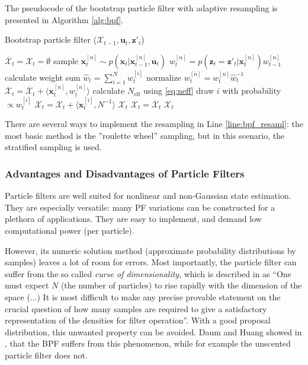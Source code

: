 The pseudocode of the bootstrap particle filter with adaptive resampling is presented in Algorithm \ref{alg:bpf}.
\begin{algorithm}[b!]
  \caption{Bootstrap particle filter ($\mathcal{X}_{t-1}, \mathbf{u}_t, \mathbf{z}'_t$)}\label{alg:bpf}
  \begin{algorithmic}[1]
    \State $\overline{\mathcal{X}}_t = \mathcal{X}_t = \emptyset$
    \State sample $\mathbf{x}_t^{[n]} \sim p(\mathbf{x}_t|\mathbf{x}_{t-1}^{[n]},\mathbf{u}_t)$
    \State$w_t^{[n]} = p(\mathbf{z}_t = \mathbf{z}'_t|\mathbf{x}_{t}^{[n]})w_{t-1}^{[n]}$
    \EndFor
    \State calculate weight sum $\hat{w}_{t} = \sum_{i = 1}^{N}w_t^{[i]}$
    \State normalize $w_t^{[n]} = w_t^{[n]}\hat{w}_t^{-1}$
    \State$\overline{\mathcal{X}}_t = \overline{\mathcal{X}}_t + \langle \mathbf{x}_t^{[n]},w_t^{[n]}\rangle$
    \EndFor
    \State calculate $N_{\mathrm{eff}}$ using \eqref{eq:neff}
    \State draw $i$ with probability $\propto w_t^{[i]}$ \label{line:bpf_resaml}
    \State${\mathcal{X}}_t ={\mathcal{X}}_t + \langle \mathbf{x}_t^{[i]},N^{-1}\rangle$
    \EndFor
    \State\Return $\mathcal{X}_t$
    \Else
    \State$\mathcal{X}_t = \overline{\mathcal{X}}_t$
    \State\Return $\mathcal{X}_t$
    \EndIf
  \end{algorithmic}
\end{algorithm}
There are several ways to implement the resampling in Line \ref{line:bpf_resaml}: the most basic method is the ''roulette wheel'' sampling, but in this scenario, the stratified sampling \cite{Li2015} is used.
\subsubsection{Advantages and Disadvantages of Particle Filters}\label{sec:pf_adv_disadv}
Particle filters are well suited for nonlinear and non-Gaussian state estimation. They are especially versatile: many PF variations can be constructed for a plethora of applications. They are easy to implement, and demand low computational power (per particle).

However, its numeric solution method (approximate probability distributions by samples) leaves a lot of room for errors. Most importantly, the particle filter can suffer from the so called \emph{curse of dimensionality}, which is described in \cite{Gordon1993} as ``One must expect $N$ (the number of particles) to rise rapidly with the dimension of the space (...) It is most difficult to make any precise provable statement on the crucial question of how many samples are required to give a satisfactory representation of the densities for filter operation''. With a good proposal distribution, this unwanted property can be avoided. Daum and Huang showed in \cite{Daum2003}, that the BPF suffers from this phenomenon, while for example the unscented particle filter does not.

